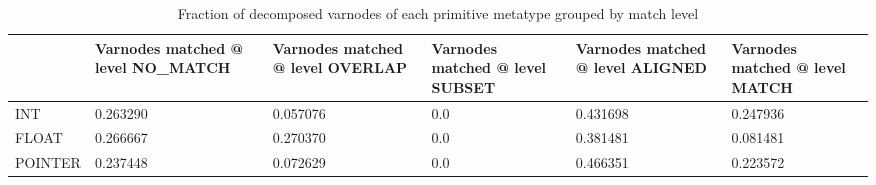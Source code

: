 \begin{table}[t]
\centering
\caption{Fraction of decomposed varnodes of each primitive metatype grouped by match level}
\label{table:metatype-match-levels-ratios-decomposed}
\begin{tabular}{lp{3.6cm}p{3.6cm}p{3.6cm}p{3.6cm}p{3.6cm}}
\toprule
{} &  Varnodes matched @ level NO\_MATCH &  Varnodes matched @ level OVERLAP &  Varnodes matched @ level SUBSET &  Varnodes matched @ level ALIGNED &  Varnodes matched @ level MATCH \\
\midrule
INT     &                           0.263290 &                          0.057076 &                              0.0 &                          0.431698 &                        0.247936 \\
FLOAT   &                           0.266667 &                          0.270370 &                              0.0 &                          0.381481 &                        0.081481 \\
POINTER &                           0.237448 &                          0.072629 &                              0.0 &                          0.466351 &                        0.223572 \\
\bottomrule
\end{tabular}
\end{table}
